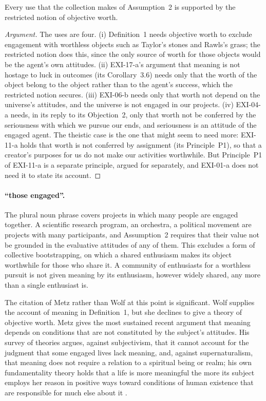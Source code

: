 \begin{proposition}\label{p:suff}
Every use that the collection makes of Assumption~2 is supported by the restricted notion of objective worth.
\end{proposition}

\begin{proof}[Argument]
The uses are four. (i) Definition~1 needs objective worth to exclude engagement with worthless objects such as Taylor's stones and Rawls's grass; the restricted notion does this, since the only source of worth for those objects would be the agent's own attitudes. (ii) EXI-17-a's argument that meaning is not hostage to luck in outcomes (its Corollary~3.6) needs only that the worth of the object belong to the object rather than to the agent's success, which the restricted notion secures. (iii) EXI-06-b needs only that worth not depend on the universe's attitudes, and the universe is not engaged in our projects. (iv) EXI-04-a needs, in its reply to its Objection~2, only that worth not be conferred by the seriousness with which we pursue our ends, and seriousness is an attitude of the engaged agent. The theistic case is the one that might seem to need more: EXI-11-a holds that worth is not conferred by assignment (its Principle~P1), so that a creator's purposes for us do not make our activities worthwhile. But Principle~P1 of EXI-11-a is a separate principle, argued for separately, and EXI-01-a does not need it to state its account.
\end{proof}

\paragraph{\enquote{those engaged}.} The plural noun phrase covers projects in which many people are engaged together. A scientific research program, an orchestra, a political movement are projects with many participants, and Assumption~2 requires that their value not be grounded in the evaluative attitudes of any of them. This excludes a form of collective bootstrapping, on which a shared enthusiasm makes its object worthwhile for those who share it. A community of enthusiasts for a worthless pursuit is not given meaning by its enthusiasm, however widely shared, any more than a single enthusiast is.


The citation of Metz rather than Wolf at this point is significant. Wolf supplies the account of meaning in Definition~1, but she declines to give a theory of objective worth. Metz gives the most sustained recent argument that meaning depends on conditions that are not constituted by the subject's attitudes. His survey of theories argues, against subjectivism, that it cannot account for the judgment that some engaged lives lack meaning, and, against supernaturalism, that meaning does not require a relation to a spiritual being or realm; his own fundamentality theory holds that a life is more meaningful the more its subject employs her reason in positive ways toward conditions of human existence that are responsible for much else about it \citep{Metz2013}.

